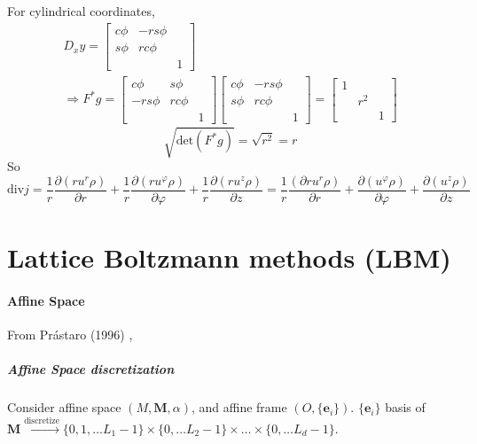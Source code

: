 \documentclass[twoside,landscape,10pt]{amsart}
\theoremstyle{plain}
\theoremstyle{definition}
\theoremstyle{remark}
\theoremstyle{remark}
\begin{document}
\begin{multicols*}{2}
For cylindrical coordinates,
\[
\begin{gathered}
  D_xy = \left[ \begin{matrix} c{\phi } & - rs{\phi} & \\ 
      s{\phi} & rc{\phi} & \\
      & & 1 \end{matrix} \right] \\ 
  \Longrightarrow F^*g = \left[ \begin{matrix} c{\phi } & s{\phi} & \\ 
      -rs{\phi} & rc{\phi} & \\
      & & 1 \end{matrix} \right] \left[ \begin{matrix} c{\phi } & - rs{\phi} & \\ 
      s{\phi} & rc{\phi} & \\
      & & 1 \end{matrix} \right]  = \left[ \begin{matrix} 1 & & \\ & r^2 & \\ & & 1 \end{matrix} \right]
\end{gathered}
\]
\[
\sqrt{ \text{det}(F^*g) } = \sqrt{r^2} =r 
\]
So
\[
\text{div}j = \frac{1}{r} \frac{ \partial (ru^r\rho ) }{ \partial r } +\frac{1}{r} \frac{ \partial (ru^{\varphi } \rho ) }{ \partial \varphi } + \frac{1}{r} \frac{ \partial (ru^z \rho ) }{ \partial z} = \frac{1}{r} \frac{ (\partial ru^r \rho  )}{ \partial r } + \frac{ \partial (u^{\varphi} \rho ) }{ \partial \varphi } + \frac{ \partial (u^z \rho ) }{ \partial z}
\]

\part{Lattice Boltzmann methods (LBM)}

\subsection{Affine Space}

From Pr\'{a}staro (1996) \cite{Pras1996},

\subsubsection{Affine Space discretization}

Consider affine space $(M,\mathbf{M},\alpha)$, and affine frame $(O,\lbrace \mathbf{e}_i \rbrace)$.  $\lbrace \mathbf{e}_i\rbrace$ basis of $\mathbf{M} \xrightarrow{\text{discretize}} \lbrace 0 , 1, \dots L_1 -1\rbrace \times \lbrace 0 ,  \dots L_2-1 \rbrace \times \dots \times \lbrace 0 ,  \dots L_d-1 \rbrace$.


\end{multicols*}
\end{document}
